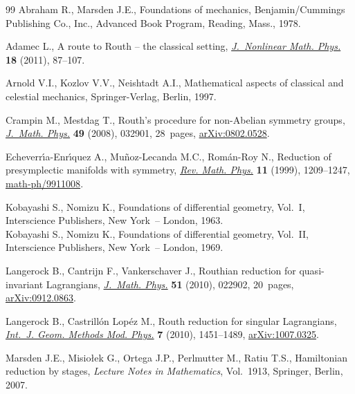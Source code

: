 \documentclass[11pt]{article}
\begin{document}
\begin{thebibliography}{99}
Abraham R., Marsden J.E.,
Foundations of mechanics,
Benjamin/Cummings Publishing Co., Inc., Advanced Book Program, Reading, Mass., 1978.

Adamec L.,
A route to Routh -- the classical setting,
\href{http://dx.doi.org/10.1142/S1402925111001180}{{\em J.~Nonlinear Math. Phys.}} {\bf 18} (2011), 87--107.

 Arnold V.I., Kozlov V.V.,   Neishtadt A.I.,
Mathematical aspects of classical and celestial mechanics,
Springer-Verlag, Berlin, 1997.

Crampin M., Mestdag T.,
Routh's procedure for non-Abelian symmetry groups,
\href{http://dx.doi.org/10.1063/1.2885077}{{\em J.~Math. Phys.}} {\bf 49} (2008), 032901, 28~pages,
\href{http://arxiv.org/abs/0802.0528}{arXiv:0802.0528}.

Echeverr{\'{\i}}a-Enr{\'{\i}}quez A., Mu{\~n}oz-Lecanda M.C.,  Rom{\'a}n-Roy N.,
Reduction of presymplectic manifolds with symmetry,
\href{http://dx.doi.org/10.1142/S0129055X99000386}{{\em Rev. Math. Phys.}} {\bf 11} (1999), 1209--1247,
\href{http://arxiv.org/abs/math-ph/9911008}{math-ph/9911008}.

Kobayashi S., Nomizu K.,
Foundations of dif\/ferential geometry, Vol.~I,
Interscience Publishers, New York~-- London, 1963.\\
Kobayashi S., Nomizu K.,
Foundations of dif\/ferential geometry, Vol.~II,
Interscience Publishers, New York~-- London, 1969.

Langerock B., Cantrijn F., Vankerschaver J.,
Routhian reduction for quasi-invariant Lagrangians,
\href{http://dx.doi.org/10.1063/1.3277181}{{\em J.~Math. Phys.}} {\bf 51} (2010), 022902, 20~pages,
\href{http://arxiv.org/abs/0912.0863}{arXiv:0912.0863}.

Langerock B., Castrill{\'o}n Lop{\'e}z M.,
Routh reduction for singular Lagrangians,
\href{http://dx.doi.org/10.1142/S0219887810004907}{{\it Int.~J. Geom. Methods Mod. Phys.}} {\bf 7} (2010), 1451--1489,
\href{http://arxiv.org/abs/1007.0325}{arXiv:1007.0325}.

 Marsden J.E., Misio{\l}ek G., Ortega J.P., Perlmutter M.,   Ratiu T.S.,
Hamiltonian reduction by stages,
{\it Lecture  Notes in Mathematics}, Vol.~1913, Springer, Berlin, 2007.


\end{thebibliography}
\end{document}
